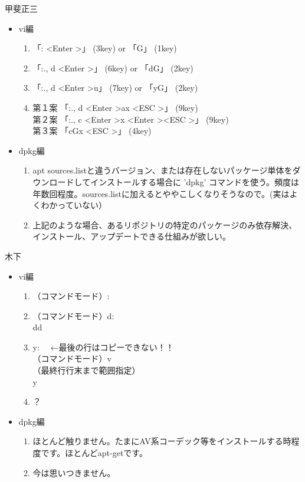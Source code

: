 \documentclass[mingoth,a4paper]{jsarticle}
\begin{document}
\begin{prework}{ 甲斐正三 }
  \begin{itemize}
  \item vi編
    \begin{enumerate}
    \item 「: \textdollar \textless Enter \textgreater」 (3key) or 「G」 (1key)
    \item 「:., \textdollar d \textless Enter \textgreater」 (6key) or 「dG」 (2key)
    \item 「:., \textdollar d \textless Enter \textgreater u」 (7key) or 「yG」 (2key)
    \item 第１案 「:., \textdollar d \textless Enter \textgreater ax \textless ESC \textgreater」 (9key) \\
第２案 「:., \textdollar c \textless Enter \textgreater x \textless Enter \textgreater \textless ESC \textgreater」 (9key) \\
第３案 「cGx \textless ESC \textgreater」 (4key)
    \end{enumerate}
  \item dpkg編
    \begin{enumerate}
    \item apt sources.listと違うバージョン、または存在しないパッケージ単体をダウンロードしてインストールする場合に 'dpkg' コマンドを使う。頻度は年数回程度。sources.listに加えるとややこしくなりそうなので。(実はよくわかっていない）
    \item 上記のような場合、あるリポジトリの特定のパッケージのみ依存解決、インストール、アップデートできる仕組みが欲しい。
    \end{enumerate}
  \end{itemize}
\end{prework}

\begin{prework}{ 木下 }
  \begin{itemize}
  \item vi編
    \begin{enumerate}
    \item （コマンドモード）: \textdollar
    \item （コマンドモード）d:\textdollar \\
dd
    \item y: \textdollar　←最後の行はコピーできない！！ \\
（コマンドモード）v \\
（最終行行末まで範囲指定） \\
y
    \item ？
    \end{enumerate}
  \item dpkg編
    \begin{enumerate}
    \item ほとんど触りません。たまにAV系コーデック等をインストールする時程度です。ほとんどapt-getです。
    \item 今は思いつきません。
    \end{enumerate}
  \end{itemize}
\end{prework}
\end{document}
